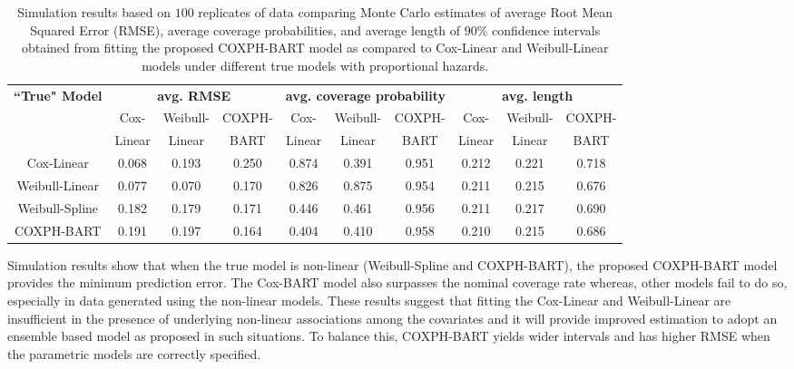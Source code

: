 \documentclass[12pt]{article}
\begin{document}
\renewcommand{\arraystretch}{1}
 \begin{table}
	\centering
	\def\~{\hphantom{0}}
		\vspace{0.2in}
  \scalebox{0.7}
  {\begin{tabular}{|c| ccc| ccc| ccc|}
				\hline 
				
				\multirow{3}{*}{\textbf{``True" Model}} &\multicolumn{3}{|c|}{\textbf{avg. RMSE}} &\multicolumn{3}{|c|}{\textbf{avg. coverage probability}}&\multicolumn{3}{|c|}{\textbf{avg. length}}
				\\ \cline{2-10}
                &Cox- &Weibull- &COXPH-&Cox- &Weibull- &COXPH- &Cox- &Weibull- &COXPH-\\
                
                &Linear &Linear &BART &Linear &Linear &BART &Linear &Linear &BART \\
				\hline 
			Cox-Linear&0.068
&0.193
&0.250

&0.874
&0.391
&0.951
&0.212
&0.221
&0.718
 \\
		      Weibull-Linear&0.077
&0.070
&0.170
&0.826
&0.875
&0.954
&0.211
&0.215
&0.676\\
                Weibull-Spline &0.182
&0.179
&0.171
&0.446
&0.461
&0.956 
&0.211
&0.217
&0.690

 \\
                COXPH-BART&0.191
&0.197
&0.164
&0.404
&0.410
&0.958
&0.210
&0.215
&0.686
 \\
			
			\hline
		\end{tabular}}
    		\caption{{Simulation results based on $100$ replicates of data comparing Monte Carlo estimates of average Root Mean Squared Error (RMSE),  average coverage probabilities, and average length of $90\%$ confidence intervals obtained from fitting the proposed COXPH-BART model as compared to Cox-Linear and Weibull-Linear models under different true models with proportional hazards.} \label{t:table-ph}}
	\vspace*{-6pt}
\end{table}

Simulation results show that when the true model is non-linear (Weibull-Spline and COXPH-BART), the proposed COXPH-BART model provides the minimum prediction error. The Cox-BART model also surpasses the nominal coverage rate whereas, other models fail to do so, especially in data generated using the non-linear models. These results suggest that fitting the Cox-Linear and Weibull-Linear  are insufficient in the presence of underlying non-linear associations among the covariates and it will provide improved estimation to adopt an ensemble based model as proposed in such situations. To balance this, COXPH-BART yields wider intervals and has higher RMSE when the parametric models are correctly specified.
\end{document}
